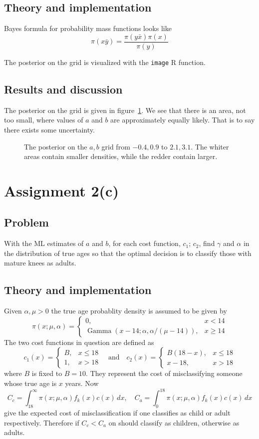 \documentclass[11pt, a4paper]{article}
\DeclareMathOperator{\GammaD}{Gamma}
\begin{document}
\subsection{Theory and implementation}
Bayes formula for probability mass functions looks like
$$ \pi(x \bar y) = \frac{\pi(y \bar x) \pi(x)}{\pi(y)} $$

The posterior on the grid is visualized with the \texttt{image} R function.
\subsection{Results and discussion}
The posterior on the grid is given in figure~\ref{fig:posterior}.
We see that there is an area, not too small,
where values of $a$ and $b$ are approximately equally likely.
That is to say there exists some uncertainty.

\begin{figure}
	\centering
	
	\caption{The posterior on the $a, b$ grid from $-0.4, 0.9$ to $2.1, 3.1$.
		The whiter areas contain smaller densities, while the redder contain larger.
	\label{fig:posterior}}
\end{figure}

\section{Assignment 2(c)}
\subsection{Problem}
With the ML estimates of $a$ and $b$,
for each cost function, $c_1$; $c_2$,
find $\gamma$ and $\alpha$ in the distribution of true ages so that
the optimal decision is to classify those with mature knees as adults.
\subsection{Theory and implementation}
Given $\alpha, \mu > 0$ the true age probablity density is assumed to be given by
$$ \pi(x; \mu, \alpha) = \begin{cases}
	0, & x < 14 \\
	\GammaD(x - 14; \alpha, \alpha / (\mu - 14)), & x \ge 14
\end{cases} $$
The two cost functions in question are defined as
$$ c_1(x) = \begin{cases} B, & x \le 18 \\ 1, & x > 18 \end{cases}
\quad \text{and} \quad
c_2(x) = \begin{cases} B (18 - x), & x \le 18 \\ x - 18, & x > 18 \end{cases} $$
where $B$ is fixed to $B = 10$.
They represent the cost of misclassifying someone whose true age is $x$ years.
Now
$$ C_c = \int_{18}^\infty \pi(x; \mu, \alpha) f_k(x) c(x) \, dx, \quad C_a = \int_0^{18} \pi(x; \mu, \alpha) f_k(x) c(x) \, dx $$
give the expected cost of misclassification
if one classifies as child or adult respectively.
Therefore if $C_c < C_a$ on should classify as children, otherwise as adults.
\end{document}
